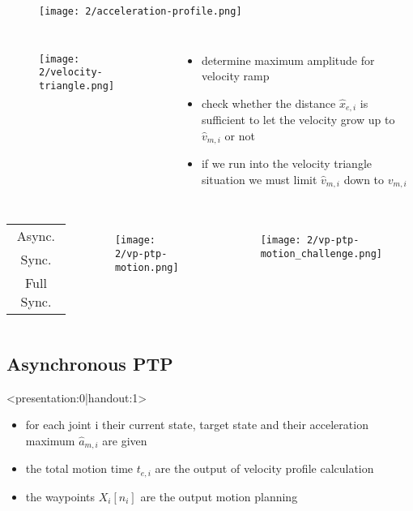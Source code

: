 \documentclass[%
  professionalfonts,%
  xcolor={%
    usenames,%
    dvipsnames,%
    svgnames,%
    table,%
    hyperref%
  }%
]{beamer}
\begin{document}
\begin{frame}
  \begin{figure}[h]
    \texttt{[image: 2/acceleration-profile.png]}
    \label{fig:acceleration-profile}
  \end{figure}
\end{frame}

\begin{frame}
  \begin{columns}
    \begin{figure}[h]
      \texttt{[image: 2/velocity-triangle.png]}
      \label{fig:velocity-triangle}
    \end{figure}
    \begin{itemize}
      \item determine maximum amplitude for velocity ramp
      \item check whether the distance $\hat{x}_{e,i}$ is sufficient to let the velocity grow up to $\hat{v}_{m,i}$ or not
      \item if we run into the velocity triangle situation we must limit $\hat{v}_{m,i}$ down to $v_{m,i}$
    \end{itemize}
  \end{columns}
\end{frame}

\begin{frame}
  \begin{columns}
	\renewcommand{\arraystretch}{3.5}
	\begin{tabular}{c}
		Async. \\ 
		Sync. \\ 
		Full Sync.
	\end{tabular} 
    \begin{figure}[h]
      \texttt{[image: 2/vp-ptp-motion.png]}
      \label{fig:vp-ptp-motion}
    \end{figure}
    \begin{figure}[h]
      \texttt{[image: 2/vp-ptp-motion\_challenge.png]}
      \label{fig:vp-ptp-motion_challenge}
    \end{figure}
  \end{columns}
\end{frame}

\subsection{Asynchronous PTP}
\begin{frame}<presentation:0|handout:1>
\begin{itemize}
\item for each joint i their current state, target state and their acceleration maximum $\hat{a}_{m,i}$ are given
\item the total motion time $t_{e,i}$ are the output of velocity profile calculation
\item the waypoints $X_{i}[n_{i}]$ are the output motion planning
\end{itemize}
\end{frame}
\end{document}
